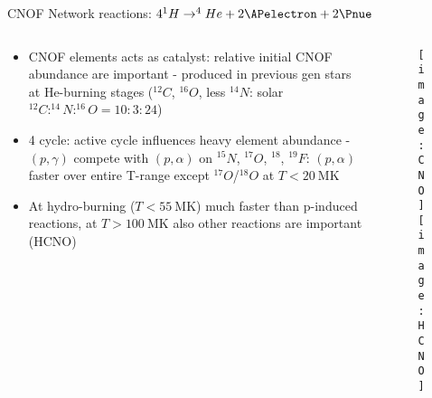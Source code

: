 \begin{frame}{CNOF Network reactions: $4^1H\to^4He+2\APelectron+2\Pnue$}
\begin{columns}[T]
\begin{column}{0.5\textwidth}
\begin{itemize}
\item CNOF elements acts as catalyst: relative initial CNOF abundance are important - produced in previous gen stars at He-burning stages ($^{12}C$, $^{16}O$, less $^{14}N$: solar $^{12}C:^{14}N:^{16}O=10:3:24$)
\item 4 cycle: active cycle influences heavy element abundance - $(p,\gamma)$ compete with $(p,\alpha)$ on $^{15}N$, $^{17}O$, $^{18}$, $^{19}F$: $(p,\alpha)$ faster over entire T-range except $^{17}O$/$^{18}O$ at $T<\SI{20}{\mega\kelvin}$
\item At hydro-burning ($T<\SI{55}{\mega\kelvin}$) much faster than p-induced reactions, at $T>\SI{100}{\mega\kelvin}$ also other reactions are important (HCNO)
\end{itemize}
\end{column}
\begin{column}{0.5\textwidth}
	\begin{figure}[!ht]
	\texttt{[image: CNO]}
	\texttt{[image: HCNO]}
\end{figure}
\end{column}
\end{columns}
\end{frame}

